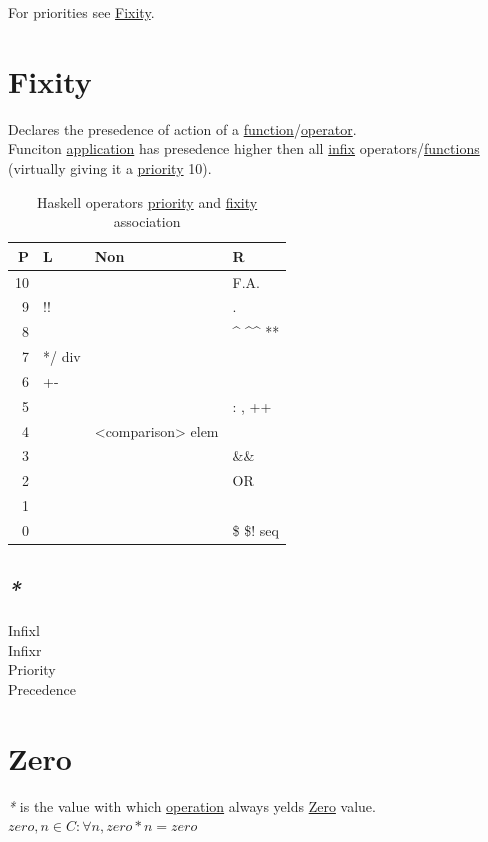 \documentclass[a4paper,14pt,oneside]{book}
\begin{document}
For priorities see \hyperref[org7df65cb]{Fixity}.\\

\section{\label{org7df65cb}Fixity}
\label{sec:org7c92099}
Declares the presedence of action of a \hyperref[org0850472]{function}/\hyperref[org2b129be]{operator}.\\

Funciton \hyperref[org50929f8]{application} has presedence higher then all \hyperref[org965ea0d]{infix} operators/\hyperref[org0bc2540]{functions} (virtually giving it a \hyperref[orgcc04607]{priority} 10).\\

\begin{table}[htbp]
\caption{\label{tab--haskell-operator-priority-fixity-association}Haskell operators \hyperref[orgcc04607]{priority} and \hyperref[org7df65cb]{fixity} association}
\centering
\begin{tabular}{rlll}
P & L & Non & R\\
\hline
10 &  &  & F.A.\\
9 & !! &  & .\\
8 &  &  & \^{} \^{}\^{} **\\
7 & */ div &  & \\
6 & +- &  & \\
5 &  &  & : , ++\\
4 &  & <comparison> elem & \\
3 &  &  & \&\&\\
2 &  &  & OR\\
1 &  &  & \\
0 &  &  & \$ \$! seq\\
\end{tabular}
\end{table}

\subsection{\emph{*}}
\label{sec:org5dec22b}

\label{org407f635}Infixl\\
\label{org4dfd461}Infixr\\
\label{orgcc04607}Priority\\
\label{org0f4e732}Precedence\\

\section{\label{org1fc9f7d}Zero}
\label{sec:org3a862fb}
\emph{*} is the value with which \hyperref[org5c15033]{operation} always yelds \hyperref[org1fc9f7d]{Zero} value.\\
\(zero, n \in C : \forall n, zero*n=zero\)\\
\end{document}
